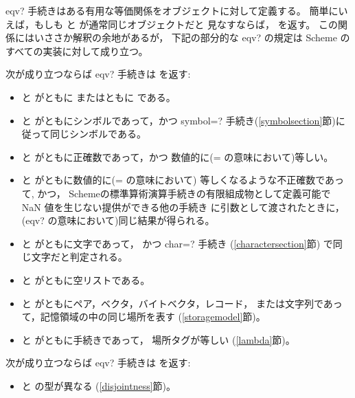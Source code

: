 \begin{entry}{%
}

{\cf eqv?} 手続きはある有用な等価関係をオブジェクトに対して定義する。
簡単にいえば，もしも  と  が通常同じオブジェクトだと
見なすならば，\schtrue{} を返す。
この関係にはいささか解釈の余地があるが，
下記の部分的な {\cf eqv?} の規定は Scheme のすべての実装に対して成り立つ。

次が成り立つならば {\cf eqv?} 手続きは \schtrue{} を返す:

\begin{itemize}
\item {} と  がともに \schtrue{} またはともに \schfalse である。

\item {} と  がともにシンボルであって，かつ
{\cf symbol=?} 手続き(\ref{symbolsection}節)に従って同じシンボルである。

\item {} と  がともに正確数であって，かつ
数値的に({\cf =} の意味において)等しい。

\item {} と  がともに数値的に({\cf =} の意味において)
等しくなるような不正確数であって, かつ，
Schemeの標準算術演算手続きの有限組成物として定義可能で NaN 値を生じない提供ができる他の手続き
に引数として渡されたときに，
({\cf eqv?} の意味において)同じ結果が得られる。

\item {} と  がともに文字であって，
かつ {\cf char=?} 手続き (\ref{charactersection}節) で同じ文字だと判定される。

\item {} と  がともに空リストである。

\item {} と  がともにペア，ベクタ，バイトベクタ，レコード，
または文字列であって，記憶領域の中の同じ場所を表す (\ref{storagemodel}節)。

\item {} と  がともに手続きであって，
場所タグが等しい (\ref{lambda}節)。
\end{itemize}

次が成り立つならば {\cf eqv?} 手続きは \schfalse{} を返す:

\begin{itemize}
\item {} と  の型が異なる (\ref{disjointness}節)。


\end{itemize}
\end{entry}
